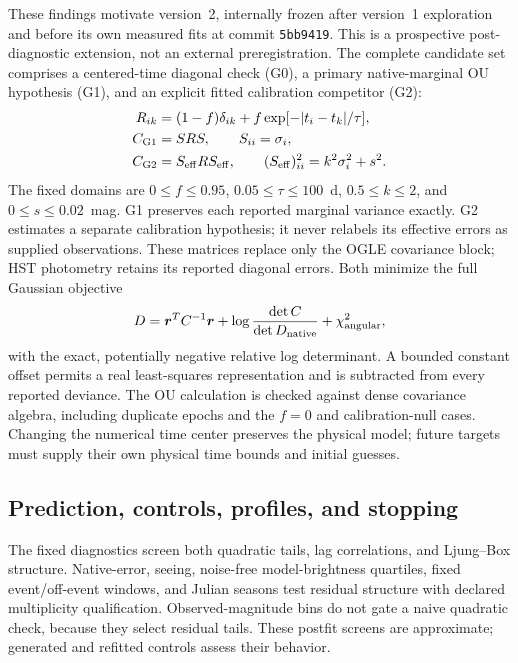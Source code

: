These findings motivate version~2, internally frozen after version~1 exploration
and before its own measured fits at commit
\texttt{5bb9419}. This is a prospective post-diagnostic extension, not an external
preregistration. The complete candidate set comprises a centered-time diagonal
check (G0), a primary native-marginal OU hypothesis (G1), and an explicit fitted
calibration competitor (G2):
\begin{align}
 R_{ik}&=(1-f)\delta_{ik}+f\exp[-|t_i-t_k|/\tau],\\
 C_{\rm G1}&=S R S,\qquad S_{ii}=\sigma_i,\\
 C_{\rm G2}&=S_{\rm eff} R S_{\rm eff},\qquad
 (S_{\rm eff})_{ii}^2=k^2\sigma_i^2+s^2.
\end{align}
The fixed domains are $0\le f\le0.95$, $0.05\le\tau\le100$~d,
$0.5\le k\le2$, and $0\le s\le0.02$~mag. G1 preserves each reported marginal
variance exactly. G2 estimates a separate calibration hypothesis; it never
relabels its effective errors as supplied observations. These matrices replace
only the OGLE covariance block; HST photometry retains its reported diagonal
errors. Both minimize the full
Gaussian objective
\begin{equation}
 D=\boldsymbol r^{T}C^{-1}\boldsymbol r+
       \log\frac{\det C}{\det D_{\rm native}}+
       \chi^2_{\rm angular},
\end{equation}
with the exact, potentially negative relative log determinant. A bounded constant
offset permits a real least-squares representation and is subtracted from every
reported deviance. The OU calculation is checked against dense covariance
algebra, including duplicate epochs and the $f=0$ and calibration-null cases.
Changing the numerical time center preserves the physical model; future targets
must supply their own physical time bounds and initial guesses.

\subsection{Prediction, controls, profiles, and stopping}

The fixed diagnostics screen both quadratic tails, lag correlations, and
Ljung--Box structure. Native-error, seeing, noise-free model-brightness quartiles,
fixed event/off-event windows, and Julian seasons test residual structure with
declared multiplicity qualification. Observed-magnitude bins do not gate a naive
quadratic check, because they select residual tails. These postfit screens are
approximate; generated and refitted controls assess their behavior.

